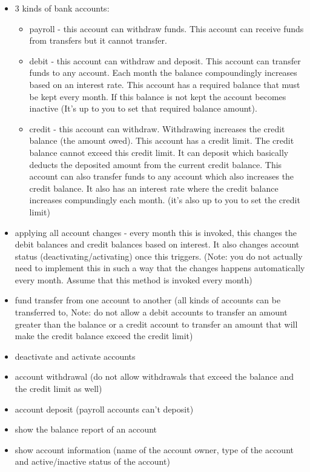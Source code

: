 \begin{itemize}
\item
  3 kinds of bank accounts:

  \begin{itemize}
  \tightlist
  \item
    payroll - this account can withdraw funds. This account can receive
    funds from transfers but it cannot transfer.
  \item
    debit - this account can withdraw and deposit. This account can
    transfer funds to any account. Each month the balance compoundingly
    increases based on an interest rate. This account has a required
    balance that must be kept every month. If this balance is not kept
    the account becomes inactive (It's up to you to set that required
    balance amount).
  \item
    credit - this account can withdraw. Withdrawing increases the credit
    balance (the amount owed). This account has a credit limit. The
    credit balance cannot exceed this credit limit. It can deposit which
    basically deducts the deposited amount from the current credit
    balance. This account can also transfer funds to any account which
    also increases the credit balance. It also has an interest rate
    where the credit balance increases compundingly each month. (it's
    also up to you to set the credit limit)
  \end{itemize}
\item
  applying all account changes - every month this is invoked, this
  changes the debit balances and credit balances based on interest. It
  also changes account status (deactivating/activating) once this
  triggers. (Note: you do not actually need to implement this in such a
  way that the changes happens automatically every month. Assume that
  this method is invoked every month)
\item
  fund transfer from one account to another (all kinds of accounts can
  be transferred to, Note: do not allow a debit accounts to transfer an
  amount greater than the balance or a credit account to transfer an
  amount that will make the credit balance exceed the credit limit)
\item
  deactivate and activate accounts
\item
  account withdrawal (do not allow withdrawals that exceed the balance
  and the credit limit as well)
\item
  account deposit (payroll accounts can't deposit)
\item
  show the balance report of an account
\item
  show account information (name of the account owner, type of the
  account and active/inactive status of the account)
\end{itemize}


